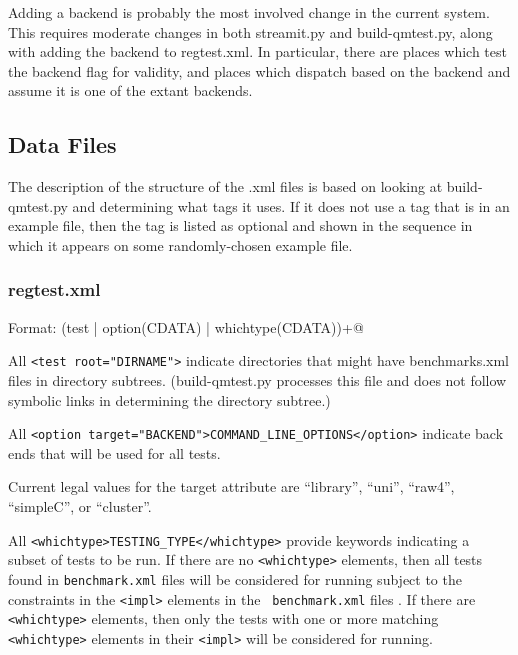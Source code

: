 \documentclass[11pt]{article}
\begin{document}
Adding a backend is probably the most involved change in the current
system.  This requires moderate changes in both \textsf{streamit.py}
and \textsf{build-qmtest.py}, along with adding the backend to
\textsf{regtest.xml}.  In particular, there are places which test the
backend flag for validity, and places which dispatch based on the
backend and assume it is one of the extant backends.

\subsection{Data Files}
The description of the structure of the .xml files is based on looking
at build-qmtest.py and determining what tags it uses.  If it does not
use a tag that is in an example file, then the tag is listed as
optional and shown in the sequence in which it appears on some
randomly-chosen example file.

\subsubsection{regtest.xml}
Format: \verb@regtest (test | option(CDATA) | whichtype(CDATA))+@

All \verb+<test root="DIRNAME">+ indicate directories that might have 
benchmarks.xml files in directory subtrees. (build-qmtest.py processes
this file and does not follow symbolic links in determining the
directory subtree.)

All \verb+<option target="BACKEND">COMMAND_LINE_OPTIONS</option>+
indicate back ends that will be used for all tests.

Current legal values for the target attribute are  ``library'', ``uni'', 
``raw4'', ``simpleC'', or ``cluster''.

All \verb+<whichtype>TESTING_TYPE</whichtype>+ provide keywords indicating a 
subset of tests to be run.
If there are no \verb+<whichtype>+ elements, then all tests found in
{\tt benchmark.xml} files will be considered for running subject to
the constraints in the \verb+<impl>+ elements in the {\tt
benchmark.xml} files .
If there are \verb+<whichtype>+ elements, then only the tests with one
or more matching \verb+<whichtype>+ elements in their \verb+<impl>+
will be considered for running.
\end{document}

